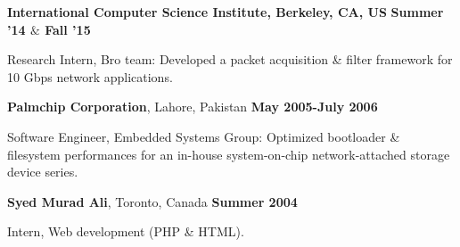 \documentclass[10pt]{article}
\newenvironment{innerlist}[1][\enskip\textbullet]%
        {\begin{compactitem}[#1]}{\end{compactitem}}
\begin{document}
\textbf{International Computer Science Institute, Berkeley, CA, US}  
				\hfill \textbf{Summer '14 $\&$ Fall '15}
\begin{innerlist}
\item {Research Intern, Bro team: Developed a packet acquisition
\& filter framework for 10 Gbps network applications.} \\
\end{innerlist}

{\textbf{Palmchip Corporation}}, 
Lahore, Pakistan%
			\hfill {\bf May 2005-July 2006}
\begin{innerlist}
\item {Software Engineer, Embedded Systems Group: Optimized bootloader \& filesystem
performances for an in-house system-on-chip network-attached storage device series.} \\
\end{innerlist}

{\textbf{Syed Murad Ali}, Toronto, Canada}%
			\hfill {\bf Summer 2004}
\begin{innerlist}
\item {Intern, Web development (PHP \& HTML).}
\end{innerlist}
\end{document}
